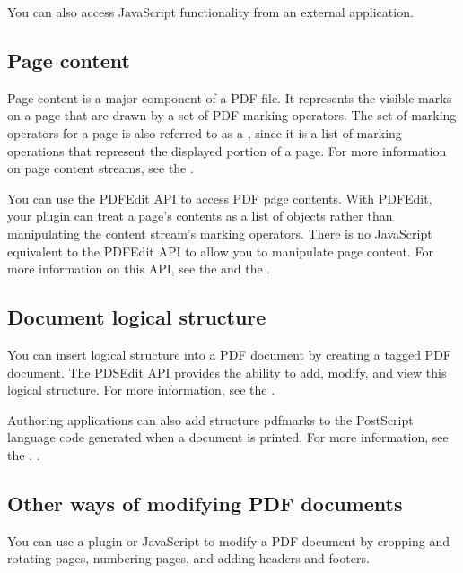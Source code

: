\documentclass[letterpaper,12pt,english,openany,oneside]{sphinxmanual}
\begin{document}
You can also access JavaScript functionality from an external application.




\subsection{Page content}
\label{\detokenize{Overview_Editing:page-content}}
Page content is a major component of a PDF file. It represents the visible marks on a page that are drawn by a set of PDF marking operators. The set of marking operators for a page is also referred to as a  , since it is a list of marking operations that represent the displayed portion of a page. For more information on page content streams, see the  .

You can use the PDFEdit API to access PDF page contents. With PDFEdit, your plug\sphinxhyphen{}in can treat a page’s contents as a list of objects rather than manipulating the content stream’s marking operators. There is no JavaScript equivalent to the PDFEdit API to allow you to manipulate page content. For more information on this API, see the  and the  .




\subsection{Document logical structure}
\label{\detokenize{Overview_Editing:document-logical-structure}}
You can insert logical structure into a PDF document by creating a tagged PDF document. The PDSEdit API provides the ability to add, modify, and view this logical structure. For more information, see the  .

Authoring applications can also add structure pdfmarks to the PostScript language code generated when a document is printed. For more information, see the .  .




\subsection{Other ways of modifying PDF documents}
\label{\detokenize{Overview_Editing:other-ways-of-modifying-pdf-documents}}
You can use a plug\sphinxhyphen{}in or JavaScript to modify a PDF document by cropping and rotating pages, numbering pages, and adding headers and footers.
\end{document}
